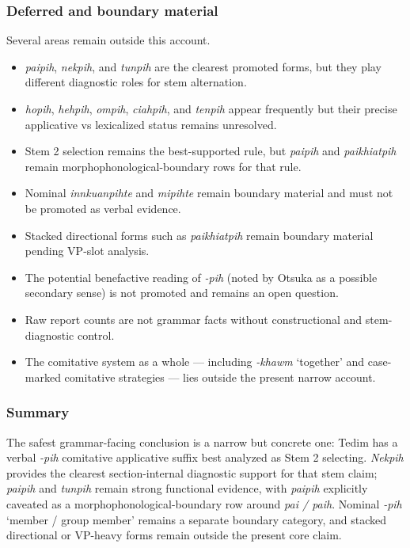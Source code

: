 \documentclass[
  11pt,
  a4paper,
]{article}
\providecommand{\tightlist}{%
  \setlength{\itemsep}{0pt}\setlength{\parskip}{0pt}}
\newcommand{\tdim}[1]{\textit{#1}}
\newcommand{\glossquote}[1]{`#1'}
\begin{document}
\subsubsection{Deferred and boundary
material}\label{deferred-and-boundary-material-7}

Several areas remain outside this account.

\begin{itemize}
\tightlist
\item
  \tdim{paipih}, \tdim{nekpih}, and \tdim{tunpih} are the clearest
  promoted forms, but they play different diagnostic roles for stem
  alternation.
\item
  \tdim{hopih}, \tdim{hehpih}, \tdim{ompih}, \tdim{ciahpih}, and
  \tdim{tenpih} appear frequently but their precise applicative vs
  lexicalized status remains unresolved.
\item
  Stem 2 selection remains the best-supported rule, but \tdim{paipih}
  and \tdim{paikhiatpih} remain morphophonological-boundary rows for
  that rule.
\item
  Nominal \tdim{innkuanpihte} and \tdim{mipihte} remain boundary
  material and must not be promoted as verbal evidence.
\item
  Stacked directional forms such as \tdim{paikhiatpih} remain boundary
  material pending VP-slot analysis.
\item
  The potential benefactive reading of \tdim{-pih} (noted by Otsuka as a
  possible secondary sense) is not promoted and remains an open
  question.
\item
  Raw report counts are not grammar facts without constructional and
  stem-diagnostic control.
\item
  The comitative system as a whole --- including \tdim{-khawm}
  \glossquote{together} and case-marked comitative strategies --- lies
  outside the present narrow account.
\end{itemize}

\subsubsection{Summary}\label{summary-8}

The safest grammar-facing conclusion is a narrow but concrete one: Tedim
has a verbal \tdim{-pih} comitative applicative suffix best analyzed as
Stem 2 selecting. \tdim{Nekpih} provides the clearest section-internal
diagnostic support for that stem claim; \tdim{paipih} and \tdim{tunpih}
remain strong functional evidence, with \tdim{paipih} explicitly
caveated as a morphophonological-boundary row around \tdim{pai / paih}.
Nominal \tdim{-pih} \glossquote{member / group member} remains a
separate boundary category, and stacked directional or VP-heavy forms
remain outside the present core claim.
\end{document}
